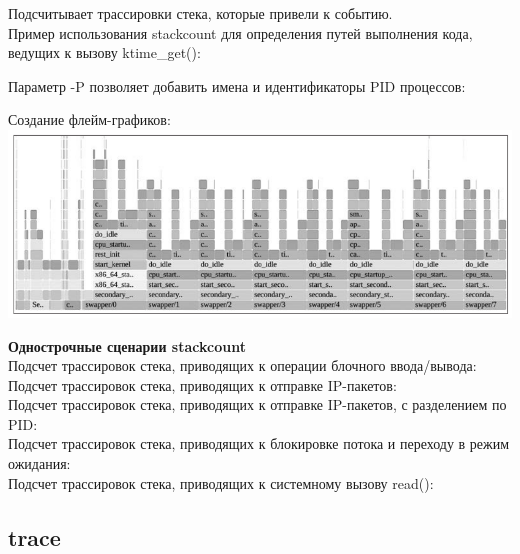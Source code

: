 Подсчитывает трассировки стека, которые привели к событию. \\

\noindent Пример использования stackcount для определения путей выполнения кода,
ведущих к вызову ktime\_get(): \\

\noindent Параметр -P позволяет добавить имена и идентификаторы PID процессов:\\

\noindent Создание флейм-графиков: \\
\includegraphics[width=1.0\linewidth]{flame_ktime_get.png}

\noindent\textbf{Однострочные сценарии stackcount} \\
Подсчет трассировок стека, приводящих к операции блочного ввода/вывода: \\
Подсчет трассировок стека, приводящих к отправке IP-пакетов: \\
Подсчет трассировок стека, приводящих к отправке IP-пакетов, с разделением по PID: \\
Подсчет трассировок стека, приводящих к блокировке потока и переходу в режим ожидания: \\
Подсчет трассировок стека, приводящих к системному вызову read(): \\


\subsection{trace}

